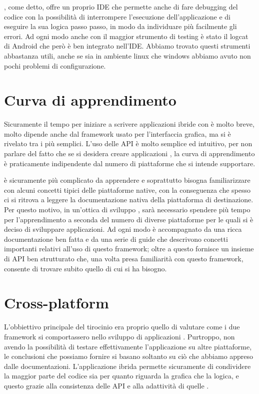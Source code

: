     \tisdk{}, come detto, offre un proprio IDE che permette anche di fare
    debugging del codice \js{} con la possibilità di interrompere
    l'esecuzione dell'applicazione e di eseguire la sua logica passo passo,
    in modo da individuare più facilmente gli errori. Ad ogni modo anche
    con \tisdk{} il maggior strumento di testing è stato il logcat di
    Android che però è ben integrato nell'IDE. Abbiamo trovato
    questi strumenti abbastanza utili, anche se sia in ambiente linux che
    windows abbiamo avuto non pochi problemi di configurazione.


    \section{Curva di apprendimento}
    Sicuramente il tempo per iniziare a scrivere applicazioni ibride con
    \pg{} è molto breve, molto dipende anche dal frame\-work usato per
    l'interfaccia grafica, ma \kendomob{} si è rivelato tra i più semplici.
    L'uso delle API è molto semplice ed intuitivo, per non parlare del
    fatto che se si desidera creare applicazioni \crossplat{}, la curva di
    apprendimento è praticamente indipendente dal numero di piattaforme
    che si intende supportare.

    \tisdk{} è sicuramente più complicato da apprendere e soprattutto
    bisogna familiarizzare con alcuni concetti tipici delle piattaforme
    native, con la conseguenza che spesso ci si ritrova a leggere la
    documentazione nativa della piattaforma di destinazione. Per
    questo motivo, in un'ottica di sviluppo \crossplat{}, sarà necessario
    spendere più tempo per l'apprendimento a seconda del numero di diverse
    piattaforme per le quali si è deciso di sviluppare applicazioni. Ad
    ogni modo \tisdk{} è accompagnato da una ricca documentazione ben
    fatta e da una serie di guide che descrivono concetti
    importanti relativi all'uso di questo frame\-work; oltre a questo
    \tisdk{} fornisce un insieme di API ben strutturato che, una volta
    presa familiarità con questo frame\-work, consente di trovare subito
    quello di cui si ha bisogno.


    \section{Cross-platform}
    L'obbiettivo principale del tirocinio era proprio quello di valutare
    come i due frame\-work si comportassero nello sviluppo di applicazioni
    \crossplat{}. Purtroppo, non avendo la possibilità di testare
    effettivamente l'applicazione su altre piattaforme, le conclusioni che
    possiamo fornire si basano soltanto su ciò che abbiamo appreso dalle
    documentazioni. L'applicazione ibrida permette sicuramente di
    condividere la maggior parte del codice sia per quanto riguarda la
    grafica che la logica, e questo grazie alla consistenza delle API \pg{}
    e alla adattività di quelle \kendomob{}.

